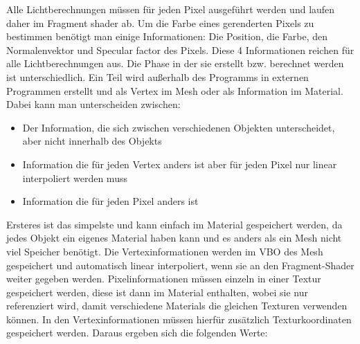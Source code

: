 Alle Lichtberechnungen müssen für jeden Pixel ausgeführt werden und laufen daher im Fragment shader ab.
Um die Farbe eines gerenderten Pixels zu bestimmen benötigt man einige Informationen: Die Position, die Farbe, den Normalenvektor und Specular factor des Pixels. Diese 4 Informationen reichen für alle Lichtberechnungen aus. Die Phase in der sie erstellt bzw. berechnet werden ist unterschiedlich. Ein Teil wird außerhalb des Programms in externen Programmen erstellt und als Vertex im Mesh oder als Information im Material. Dabei kann man unterscheiden zwischen:
\begin{itemize}
	\item Der Information, die sich zwischen verschiedenen Objekten unterscheidet, aber nicht innerhalb des Objekts
	\item Information die für jeden Vertex anders ist aber für jeden Pixel nur linear interpoliert werden muss
	\item Information die für jeden Pixel anders ist
\end{itemize}
Ersteres ist das simpelste und kann einfach im Material gespeichert werden, da jedes Objekt ein eigenes Material haben kann und es anders als ein Mesh nicht viel Speicher benötigt. 
Die Vertexinformationen werden im \ac{VBO} des Mesh gespeichert und automatisch linear interpoliert, wenn sie an den Fragment-Shader weiter gegeben werden. Pixelinformationen müssen einzeln in einer Textur gespeichert werden, diese ist dann im Material enthalten, wobei sie nur referenziert wird, damit verschiedene Materials die gleichen Texturen verwenden können. In den Vertexinformationen müssen hierfür zusätzlich Texturkoordinaten gespeichert werden. Daraus ergeben sich die folgenden Werte:

